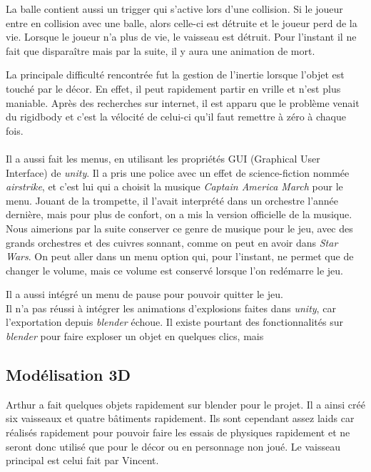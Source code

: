 \documentclass[10pt, titlepage]{report}
\begin{document}
La balle contient aussi un trigger qui s'active lors d'une collision. Si le joueur entre en collision avec une balle, alors celle-ci est détruite et le joueur perd de la vie. Lorsque le joueur n'a plus de vie, le vaisseau est détruit. Pour l'instant il ne fait que disparaître mais par la suite, il y aura une animation de mort.

La principale difficulté rencontrée fut la gestion de l'inertie lorsque l'objet est touché par le décor. En effet, il peut rapidement partir en vrille et n'est plus maniable. Après des recherches sur internet, il est apparu que le problème venait du rigidbody et c'est la vélocité de celui-ci qu'il faut remettre à zéro à chaque fois.\\ \\

 Il a aussi fait les menus, en utilisant les propriétés GUI (Graphical User Interface) de \textit{unity}. Il a pris une police avec un effet de science-fiction nommée \textit{airstrike}, et c'est lui qui a choisit la musique \textit{Captain America March} pour le menu. Jouant de la trompette, il l'avait interprété dans un orchestre l'année dernière, mais pour plus de confort, on a mis la version officielle de la musique. Nous aimerions par la suite conserver ce genre de musique pour le jeu, avec des grands orchestres et des cuivres sonnant, comme on peut en avoir dans \textit{Star Wars}. On peut aller dans un menu option qui, pour l'instant, ne permet que de changer le volume, mais ce volume est conservé lorsque l'on redémarre le jeu.

Il a aussi intégré un menu de pause pour pouvoir quitter le jeu.\\

Il n'a pas réussi à intégrer les animations d'explosions faites dans \textit{unity}, car l'exportation depuis \textit{blender} échoue. Il existe pourtant des fonctionnalités sur \textit{blender} pour faire exploser un objet en quelques clics, mais

\subsection{Modélisation 3D}
Arthur a fait quelques objets rapidement sur blender pour le projet. Il a ainsi créé six vaisseaux et quatre bâtiments rapidement. Ils sont cependant assez laids car réalisés rapidement pour pouvoir faire les essais de physiques rapidement et ne seront donc utilisé que pour le décor ou en personnage non joué. Le vaisseau principal est celui fait par Vincent.\\
\end{document}
